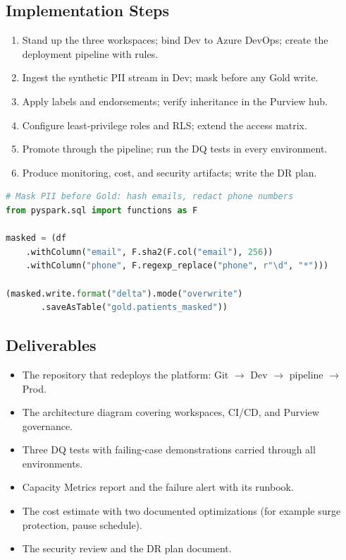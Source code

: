 \subsection*{Implementation Steps}
\begin{enumerate}
    \item Stand up the three workspaces; bind Dev to Azure DevOps; create the deployment pipeline with rules.
    \item Ingest the synthetic PII stream in Dev; mask before any Gold write.
    \item Apply labels and endorsements; verify inheritance in the Purview hub.
    \item Configure least-privilege roles and RLS; extend the access matrix.
    \item Promote through the pipeline; run the DQ tests in every environment.
    \item Produce monitoring, cost, and security artifacts; write the DR plan.
\end{enumerate}

\begin{lstlisting}[language=Python,caption={Milestone 6: mask PII before any Gold write.},label={lst:chapter24-capstone-masking}]
# Mask PII before Gold: hash emails, redact phone numbers
from pyspark.sql import functions as F

masked = (df
    .withColumn("email", F.sha2(F.col("email"), 256))
    .withColumn("phone", F.regexp_replace("phone", r"\d", "*")))

(masked.write.format("delta").mode("overwrite")
       .saveAsTable("gold.patients_masked"))
\end{lstlisting}

\subsection*{Deliverables}
\begin{itemize}
    \item The repository that redeploys the platform: Git $\rightarrow$ Dev $\rightarrow$ pipeline $\rightarrow$ Prod.
    \item The architecture diagram covering workspaces, CI/CD, and Purview governance.
    \item Three DQ tests with failing-case demonstrations carried through all environments.
    \item Capacity Metrics report and the failure alert with its runbook.
    \item The cost estimate with two documented optimizations (for example surge protection, pause schedule).
    \item The security review and the DR plan document.
\end{itemize}

